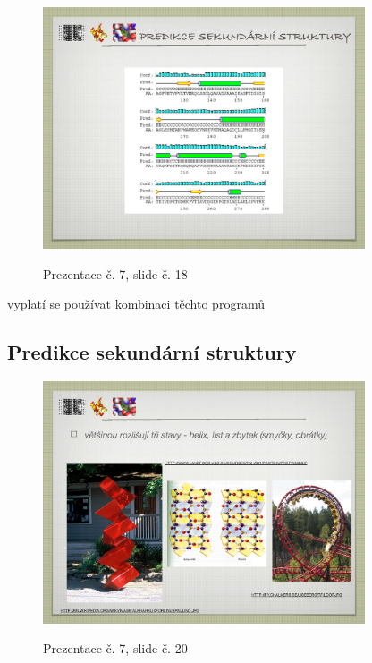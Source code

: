 \documentclass[DIV=8]{scrreprt}
\begin{document}
\begin{myItemize}[nosep]
\begin{figure}
    \centering
    \label{slides-7-slide-17}
\end{figure}
\begin{figure}
    \caption{Prezentace č. 7, slide č. 18}
    \includegraphics[width=0.85\textwidth]{slides-7/slide-18.jpg}
    \centering
    \label{slides-7-slide-18}
\end{figure}

\begin{myItemize}[nosep]
    \item vyplatí se používat kombinaci těchto programů
\end{myItemize}

\end{myItemize}



\subsection{Predikce sekundární struktury} \label{Predikce sekundární struktury}


\begin{figure}
    \caption{Prezentace č. 7, slide č. 20}
    \includegraphics[width=0.85\textwidth]{slides-7/slide-20.jpg}
    \centering
    \label{slides-7-slide-20}
\end{figure}
\end{document}
